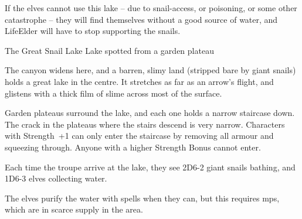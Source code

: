\begin{multicols}{2}
If the elves cannot use this lake -- due to snail-access, or poisoning, or some other catastrophe -- they will find themselves without a good source of water, and \gls{LifeElder} will have to stop supporting the snails.

{The Great Snail Lake}%
{Lake spotted from a garden plateau}%

The canyon widens here, and a barren, slimy land (stripped bare by giant snails) holds a great lake in the centre.
It stretches as far as an arrow's flight, and glistens with a thick film of slime across most of the surface.

Garden plateaus surround the lake, and each one holds a narrow staircase down.
The crack in the plateaus where the stairs descend is very narrow.
Characters with Strength~+1 can only enter the staircase by removing all armour and squeezing through.
Anyone with a higher Strength Bonus cannot enter.

Each time the troupe arrive at the lake,
they see 2D6-2 giant snails bathing, and 1D6-3 elves collecting water.

The elves purify the water with spells when they can, but this requires \glspl{mp}, which are in scarce supply in the area.

\end{multicols}

